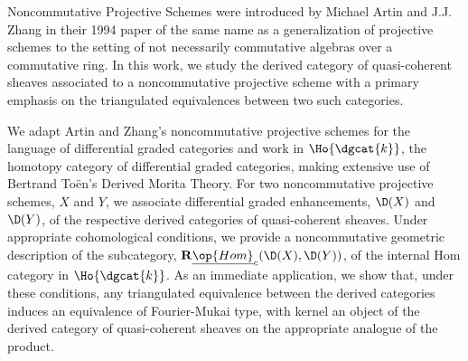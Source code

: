 Noncommutative Projective Schemes were introduced by Michael Artin and J.J. Zhang in their 1994 paper of the same name as a generalization of projective schemes to the setting of not necessarily commutative algebras over a commutative ring.
In this work, we study the derived category of quasi-coherent sheaves associated to a noncommutative projective scheme with a primary emphasis on the triangulated equivalences between two such categories.

We adapt Artin and Zhang's noncommutative projective schemes for the language of differential graded categories and work in \(\Ho{\dgcat{k}}\), the homotopy category of differential graded categories, making extensive use of Bertrand To\"en's Derived Morita Theory.
For two noncommutative projective schemes, \(X\) and \(Y\), we associate differential graded enhancements, \(\D(X)\) and \(\D(Y)\), of the respective derived categories of quasi-coherent sheaves.
Under appropriate cohomological conditions, we provide a noncommutative geometric description of the subcategory, \(\mathbf{R}\underline{\op{Hom}}_c(\D(X), \D(Y))\), of the internal Hom category in \(\Ho{\dgcat{k}}\).
As an immediate application, we show that, under these conditions, any triangulated equivalence between the derived categories induces an equivalence of Fourier-Mukai type, with kernel an object of the derived category of quasi-coherent sheaves on the appropriate analogue of the product.
